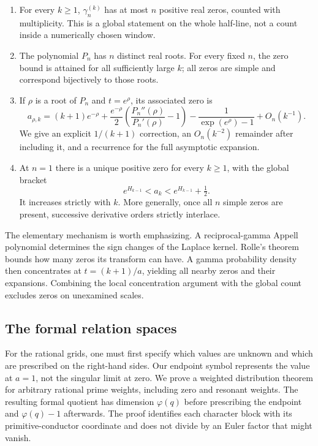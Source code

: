 \documentclass[11pt,a4paper]{article}
\theoremstyle{definition}
\theoremstyle{remark}
\numberwithin{equation}{section}
\begin{document}
\begin{enumerate}
\item For every $k\geq1$, $\gamma_n^{(k)}$ has at most $n$ positive real
zeros, counted with multiplicity.  This is a global statement on the
whole half-line, not a count inside a numerically chosen window.
\item The polynomial $P_n$ has $n$ distinct real roots.  For every fixed
$n$, the zero bound is attained for all sufficiently large $k$; all
zeros are simple and correspond bijectively to those roots.
\item If $\rho$ is a root of $P_n$ and $t=e^\rho$, its associated zero is
\begin{equation}\label{intro:zero-result}
 a_{\rho,k}=(k+1)e^{-\rho}
   +\frac{e^{-\rho}}2\left(\frac{P_n''(\rho)}{P_n'(\rho)}-1\right)
   -\frac1{\exp(e^\rho)-1}+O_n(k^{-1}).
\end{equation}
We give an explicit $1/(k+1)$ correction, an $O_n(k^{-2})$ remainder
after including it, and a recurrence for the full asymptotic expansion.
\item At $n=1$ there is a unique positive zero for every $k\geq1$, with
the global bracket
\[
 e^{H_{k-1}}<a_k<e^{H_{k-1}}+\tfrac12.
\]
It increases strictly with $k$.  More generally, once all $n$ simple
zeros are present, successive derivative orders strictly interlace.
\end{enumerate}

The elementary mechanism is worth emphasizing.  A reciprocal-gamma
Appell polynomial determines the sign changes of the Laplace kernel.
Rolle's theorem bounds how many zeros its transform can have.  A gamma
probability density then concentrates at $t=(k+1)/a$, yielding all
nearby zeros and their expansions.  Combining the local concentration
argument with the global count excludes zeros on unexamined scales.

\subsection{The formal relation spaces}

For the rational grids, one must first specify which values are unknown
and which are prescribed on the right-hand sides.  Our endpoint symbol
represents the value at $a=1$, not the singular limit at zero.
We prove a weighted distribution theorem for arbitrary rational prime
weights, including zero and resonant weights.  The resulting formal
quotient has dimension $\varphi(q)$ before prescribing the endpoint and
$\varphi(q)-1$ afterwards.  The proof identifies each character block
with its primitive-conductor coordinate and does not divide by an
Euler factor that might vanish.
\end{document}
